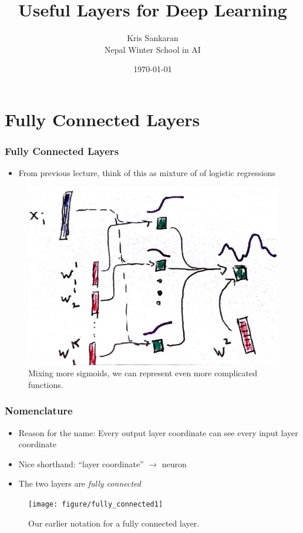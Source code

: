 \documentclass[10pt,mathserif]{beamer}
\title{\large \bfseries Useful Layers for Deep Learning}
\author{Kris Sankaran\\[3ex] Nepal Winter School in AI}
\date{\today}
\begin{document}
\maketitle

\section{Fully Connected Layers}

\begin{frame}
  \frametitle{Fully Connected Layers}
  \begin{itemize}
  \item From previous lecture, think of this as mixture of of logistic
    regressions
  \end{itemize}
  \begin{figure}
    \centering
    \includegraphics[width=0.55\paperwidth]{figure/mixture_logistic_k}
    \caption{Mixing more sigmoids, we can represent even more complicated
      functions. \label{fig:mixture_logistic_k} }
  \end{figure}
\end{frame}

\begin{frame}
  \frametitle{Nomenclature}
  \begin{itemize}
  \item Reason for the name: Every output layer coordinate can see every input
    layer coordinate
  \item Nice shorthand: ``layer coordinate'' $\rightarrow$ neuron
  \item The two layers are \textit{fully connected}
  \end{itemize}
\begin{figure}
  \centering
  \texttt{[image: figure/fully\_connected1]}
  \caption{Our earlier notation for a fully connected layer.}
\end{figure}
\end{frame}
\end{document}
